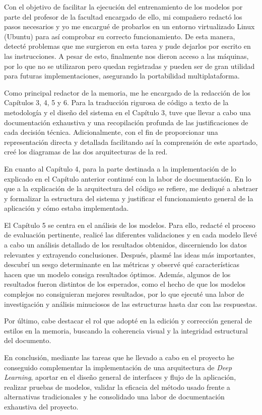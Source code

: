 Con el objetivo de facilitar la ejecución del entrenamiento de los modelos por parte del profesor de la facultad encargado de ello, mi compañero redactó los pasos necesarios y yo me encargué de probarlos en un entorno virtualizado Linux (Ubuntu) para así comprobar su correcto funcionamiento. De esta manera, detecté problemas que me surgieron en esta tarea y pude dejarlos por escrito en las instrucciones. A pesar de esto, finalmente nos dieron acceso a las máquinas, por lo que no se utilizaron pero quedan registradas y pueden ser de gran utilidad para futuras implementaciones, asegurando la portabilidad multiplataforma. 

Como principal redactor de la memoria, me he encargado de la redacción de los Capítulos 3, 4, 5 y 6. Para la traducción rigurosa de código a texto de la metodología y el diseño del sistema en el Capítulo 3, tuve que llevar a cabo una documentación exhaustiva y una recopilación profunda de las justificaciones de cada decisión técnica. Adicionalmente, con el fin de proporcionar una representación directa y detallada facilitando así la comprensión de este apartado, creé los diagramas de las dos arquitecturas de la red.

En cuanto al Capítulo 4, para la parte destinada a la implementación de lo explicado en el Capítulo anterior continué con la labor de documentación. En lo que a la explicación de la arquitectura del código se refiere, me dediqué a abstraer y formalizar la estructura del sistema y justificar el funcionamiento general de la aplicación y cómo estaba implementada. 

El Capítulo 5 se centra en el análisis de los modelos. Para ello, redacté el proceso de evaluación pertinente, realicé las diferentes validaciones y en cada modelo llevé a cabo un análisis detallado de los resultados obtenidos, discerniendo los datos relevantes y extrayendo conclusiones. Después, plasmé las ideas más importantes, descubrí un sesgo determinante en las métricas y observé qué características hacen que un modelo consiga resultados óptimos. Además, algunos de los resultados fueron distintos de los esperados, como el hecho de que los modelos complejos no consiguieran mejores resultados, por lo que ejecuté una labor de investigación y análisis minuciosos de las estructuras hasta dar con las respuestas. 

Por último, cabe destacar el rol que adopté en la edición y corrección general de estilos en la memoria, buscando la coherencia visual y la integridad estructural del documento.

En conclusión, mediante las tareas que he llevado a cabo en el proyecto he conseguido complementar la implementación de una arquitectura de \textit{Deep Learning}, aportar en el diseño general de interfaces y flujo de la aplicación, realizar pruebas de modelos, validar la eficacia del método usado frente a alternativas tradicionales y he consolidado una labor de documentación exhaustiva del proyecto.  


